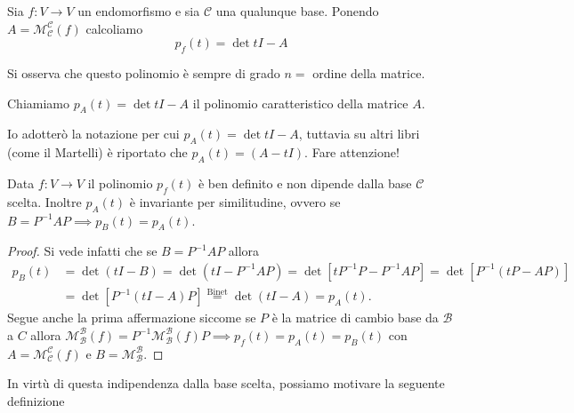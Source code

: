 Sia $f: V \to V$ un endomorfismo e sia $\mathcal{C}$ una qualunque base. Ponendo $A = \mathcal{M}^\mathcal{C}_\mathcal{C}(f)$ calcoliamo
$$
    p_f(t) = \det{tI - A}
$$
\begin{remark}
    Si osserva che questo polinomio è sempre di grado $n =$ ordine della matrice.
\end{remark}
\begin{definition}
    Chiamiamo $p_A(t) = \det{tI - A}$ il polinomio caratteristico della matrice $A$.
\end{definition}
\begin{remark}
    Io adotterò la notazione per cui $p_A(t) = \det{tI-A}$, tuttavia su altri libri (come il Martelli) è riportato che $p_A(t) = (A - tI)$. Fare attenzione!
\end{remark}
\begin{theorem}
    Data $f: V \to V$ il polinomio $p_f(t)$ è ben definito e non dipende dalla base $\mathcal{C}$ scelta. Inoltre $p_A(t)$ è invariante per similitudine, ovvero se $B = P^{-1}AP \implies p_B(t) = p_A(t)$.
\end{theorem}
\begin{proof}
    Si vede infatti che se $B = P^{-1}AP$ allora
    \begin{align}
    p_B(t) &= \det{(tI - B)} = \det{(tI - P^{-1}AP)} = \det{[tP^{-1}P - P^{-1}AP]} = \det{[P^{-1}(tP - AP)]} \\
    &= \det{[P^{-1}(tI - A)P]} \stackrel{\text{Binet}}{=} \det{(tI - A)} = p_A(t).
    \end{align}
    Segue anche la prima affermazione siccome se $P$ è la matrice di cambio base da $\mathcal{B}$ a $C$ allora $\mathcal{M}^\mathcal{B}_\mathcal{B}(f) = P^{-1} \mathcal{M}^\mathcal{B}_\mathcal{B}(f) P \implies p_f(t) = p_A(t) = p_B(t)$ con $A = \mathcal{M}^\mathcal{C}_\mathcal{C}(f)$ e $B = \mathcal{M}^\mathcal{B}_\mathcal{B}$.
\end{proof}
In virtù di questa indipendenza dalla base scelta, possiamo motivare la seguente definizione

